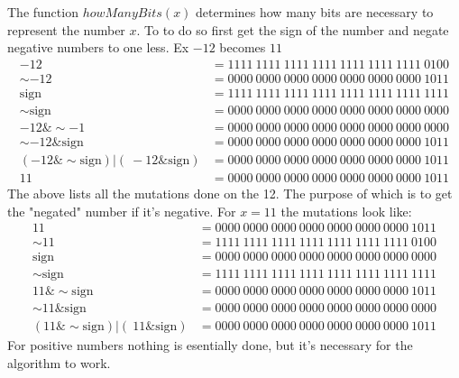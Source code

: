 \documentclass[11pt]{report}
\begin{document}
The function $howManyBits(x)$ determines how many bits are necessary to represent the number $x$. To to do so first get the sign of the number and negate negative numbers to one less. Ex $-12$ becomes $11$
\begin{align*}
    -12 &= 1111\ 1111\ 1111\ 1111\ 1111\ 1111\ 1111\ 0100\\
    \sim-12 &= 0000\ 0000\ 0000\ 0000\ 0000\ 0000\ 0000\ 1011\\
    \text{sign}  &= 1111\ 1111\ 1111\ 1111\ 1111\ 1111\ 1111\ 1111\\
    \sim\text{sign} &= 0000\ 0000\ 0000\ 0000\ 0000\ 0000\ 0000\ 0000\\
    -12 \& \sim-1 &= 0000\ 0000\ 0000\ 0000\ 0000\ 0000\ 0000\ 0000\\
    \sim-12 \& \text{sign} &= 0000\ 0000\ 0000\ 0000\ 0000\ 0000\ 0000\ 1011\\
    (-12 \& \sim\text{sign}) | (~-12 \& \text{sign}) &= 0000\ 0000\ 0000\ 0000\ 0000\ 0000\ 0000\ 1011\\
    11  &= 0000\ 0000\ 0000\ 0000\ 0000\ 0000\ 0000\ 1011
\end{align*}
The above lists all the mutations done on the 12. The purpose of which is to get the "negated" number if it's negative. For $x=11$ the mutations look like:
\begin{align*}
    11 &= 0000\ 0000\ 0000\ 0000\ 0000\ 0000\ 0000\ 1011\\
    \sim11 &= 1111\ 1111\ 1111\ 1111\ 1111\ 1111\ 1111\ 0100\\
    \text{sign} &= 0000\ 0000\ 0000\ 0000\ 0000\ 0000\ 0000\ 0000\\
    \sim\text{sign} &= 1111\ 1111\ 1111\ 1111\ 1111\ 1111\ 1111\ 1111\\
    11 \& \sim\text{sign} &= 0000\ 0000\ 0000\ 0000\ 0000\ 0000\ 0000\ 1011\\
    \sim11 \& \text{sign} &= 0000\ 0000\ 0000\ 0000\ 0000\ 0000\ 0000\ 0000\\
    (11 \& \sim\text{sign}) | (~11 \& \text{sign}) &= 0000\ 0000\ 0000\ 0000\ 0000\ 0000\ 0000\ 1011
\end{align*}
For positive numbers nothing is esentially done, but it's necessary for the algorithm to work. 
\end{document}
